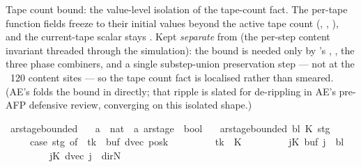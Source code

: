 \begin{isabellebody}
\begin{isamarkuptext}%
Tape count bound: the value-level isolation of the tape-count fact.
  The per-tape function fields freeze to their initial values beyond the
  active tape count  (,
  ,
  ), and the current-tape scalar
   stays .  Kept \emph{separate} from
   (the per-step content invariant threaded through
  the simulation): the bound is needed only by 's
  , , the three phase combiners,
  and a single substep-union preservation step — not at the ~120 content
  sites — so the tape count fact is localised rather than smeared.  (AE's
   folds the bound in directly; that ripple is
  slated for de-rippling in AE's pre-AFP defensive review, converging on
  this isolated shape.)%
\end{isamarkuptext}\isamarkuptrue%
\isamarkupfalse%
\ ar{\isacharunderscore}{\kern0pt}stage{\isacharunderscore}{\kern0pt}bounded\ {\isacharcolon}{\kern0pt}{\isacharcolon}{\kern0pt}\isanewline
\ \ {\isachardoublequoteopen}{\isacharprime}{\kern0pt}a\ {\isasymRightarrow}\ nat\ {\isasymRightarrow}\ {\isacharprime}{\kern0pt}a\ ar{\isacharunderscore}{\kern0pt}stage\ {\isasymRightarrow}\ bool{\isachardoublequoteclose}\ \isanewline
\ \ {\isachardoublequoteopen}ar{\isacharunderscore}{\kern0pt}stage{\isacharunderscore}{\kern0pt}bounded\ bl\ K\ stg\ {\isasymlongleftrightarrow}\isanewline
\ \ \ \ \ {\isacharparenleft}{\kern0pt}case\ stg\ of\ {\isacharparenleft}{\kern0pt}{\isacharunderscore}{\kern0pt}{\isacharcomma}{\kern0pt}\ tk{\isacharcomma}{\kern0pt}\ {\isacharunderscore}{\kern0pt}{\isacharcomma}{\kern0pt}\ buf{\isacharcomma}{\kern0pt}\ dvec{\isacharcomma}{\kern0pt}\ posk{\isacharparenright}{\kern0pt}\ {\isasymRightarrow}\isanewline
\ \ \ \ \ \ \ \ tk\ {\isacharless}{\kern0pt}\ K\isanewline
\ \ \ \ \ \ \ \ {\isasymand}\ {\isacharparenleft}{\kern0pt}{\isasymforall}j{\isasymge}K{\isachardot}{\kern0pt}\ buf\ j\ {\isacharequal}{\kern0pt}\ bl{\isacharparenright}{\kern0pt}\isanewline
\ \ \ \ \ \ \ \ {\isasymand}\ {\isacharparenleft}{\kern0pt}{\isasymforall}j{\isasymge}K{\isachardot}{\kern0pt}\ dvec\ j\ {\isacharequal}{\kern0pt}\ dir{\isachardot}{\kern0pt}N{\isacharparenright}{\kern0pt}\isanewline

\end{isabellebody}
